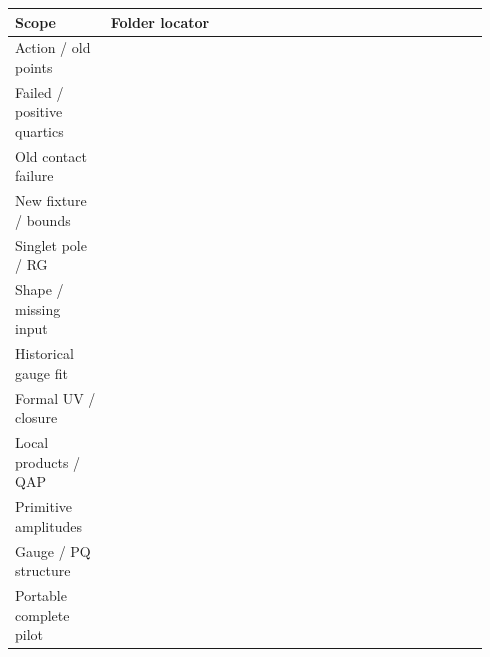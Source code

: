 \documentclass[10pt,letterpaper]{article}
\newcommand{\pathref}[1]{\texttt{\detokenize{#1}}}
\begin{document}
{\small
\begin{tabular}{p{0.19\linewidth}p{0.75\linewidth}}
\toprule Scope & Folder locator\\
\midrule
Action / old points & \pathref{canonical_so10_scalar_reconstruction/}\newline
\pathref{canonical_so10_scalar_benchmark/}\\[3pt]
Failed / positive quartics & \pathref{canonical_so10_light_higgs_quartic/}\newline
\pathref{canonical_so10_positive_higgs/}\\[3pt]
Old contact failure & \pathref{canonical_so10_radial_input_control/}\\[3pt]
New fixture / bounds & \pathref{canonical_so10_coherent_joint_witness/}\newline
\pathref{canonical_so10_complete_contact_bound/}\newline
\pathref{canonical_so10_finite_full_bfb/}\\[3pt]
Singlet pole / RG & \pathref{canonical_so10_singlet_pole_control/}\newline
\pathref{canonical_so10_singlet_pole_rg_check/}\\[3pt]
Shape / missing input & \pathref{canonical_so10_singlet_momentum_shape/}\newline
\pathref{canonical_so10_singlet_two_loop_input_closure/}\newline
\pathref{canonical_so10_scalar_gauge_homothety/}\\[3pt]
Historical gauge fit & \pathref{canonical_so10_direct_gauge_next_order/}\\[3pt]
Formal UV / closure & \pathref{canonical_so10_bv_uv_residue_bridge/}\newline
\pathref{canonical_so10_physical_counterterm_span/}\newline
\pathref{canonical_so10_one_loop_acceptance_reconciliation/}\\[3pt]
Local products / QAP & \pathref{canonical_so10_graded_causal_qap/}\newline
\pathref{canonical_so10_background_reference_normalization/}\newline
\pathref{canonical_so10_local_cutoff_comparison/}\\[3pt]
Primitive amplitudes & \pathref{canonical_so10_vector_quartic_ir_matching/}\newline
\pathref{canonical_so10_vector_scalar_quartic/}\newline
\pathref{canonical_so10_scalar_current_vss_assembly/}\newline
\pathref{canonical_so10_ghost_scalar_sunset/}\\[3pt]
Gauge / PQ structure & \pathref{canonical_so10_local_gauge_anomaly/}\newline
\pathref{canonical_so10_pq_anomaly_screen/}\\[3pt]
Portable complete pilot & \pathref{tools/portable_dh_v1/README.md}\\
\bottomrule
\end{tabular}}
\end{document}
